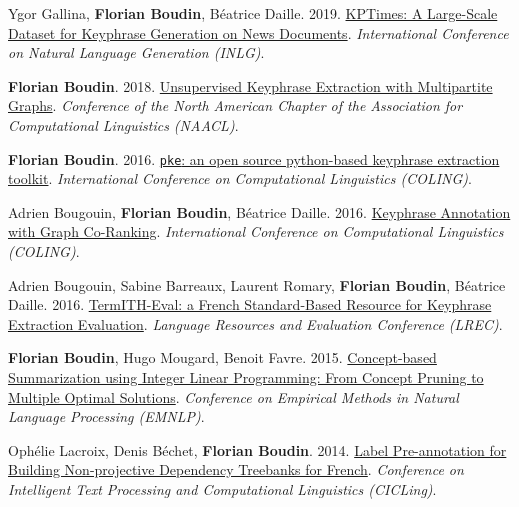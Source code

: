\item 
Ygor Gallina, \textbf{Florian Boudin}, Béatrice Daille.
2019.
\href{https://aclanthology.org/W19-8617.pdf}{KPTimes: A Large-Scale Dataset for Keyphrase Generation on News Documents}.
\textit{International Conference on Natural Language Generation (INLG)}.
\label{gallina-etal-2019-kptimes}

\item
\textbf{Florian Boudin}.
2018.
\href{https://aclanthology.org/N18-2105.pdf}{Unsupervised Keyphrase Extraction with Multipartite Graphs}.
\textit{Conference of the North American Chapter of the Association for Computational Linguistics (NAACL)}.
\label{boudin-2018-unsupervised}

\item 
\textbf{Florian Boudin}.
2016.
\href{https://aclanthology.org/C16-2015.pdf}{\texttt{pke}: an open source python-based keyphrase extraction toolkit}.
\textit{International Conference on Computational Linguistics (COLING)}.
\label{boudin-2016-pke}

\item 
Adrien Bougouin, \textbf{Florian Boudin}, Béatrice Daille.
2016.
\href{https://aclanthology.org/C16-1277.pdf}{Keyphrase Annotation with Graph Co-Ranking}.
\textit{International Conference on Computational Linguistics (COLING)}.
\label{bougouin-etal-2016-keyphrase}

\item 
Adrien Bougouin, Sabine Barreaux, Laurent Romary, \textbf{Florian Boudin}, Béatrice Daille.
2016.
\href{https://aclanthology.org/L16-1304.pdf}{TermITH-Eval: a French Standard-Based Resource for Keyphrase Extraction Evaluation}.
\textit{Language Resources and Evaluation Conference (LREC)}.
\label{bougouin-etal-2016-termith}

\item 
\textbf{Florian Boudin}, Hugo Mougard, Benoit Favre.
2015.
\href{https://aclanthology.org/D15-1220.pdf}{Concept-based Summarization using Integer Linear Programming: From Concept Pruning to Multiple Optimal Solutions}.
\textit{Conference on Empirical Methods in Natural Language Processing (EMNLP)}.
\label{boudin-etal-2015-concept}

\item 
Ophélie Lacroix, Denis Béchet, \textbf{Florian Boudin}.
2014.
\href{https://hal.archives-ouvertes.fr/hal-01004007/file/CICLing2014.pdf}{Label Pre-annotation for Building Non-projective Dependency Treebanks for French}.
\textit{Conference on Intelligent Text Processing and Computational Linguistics (CICLing)}.
\label{lacroix-etal-2014-label}


